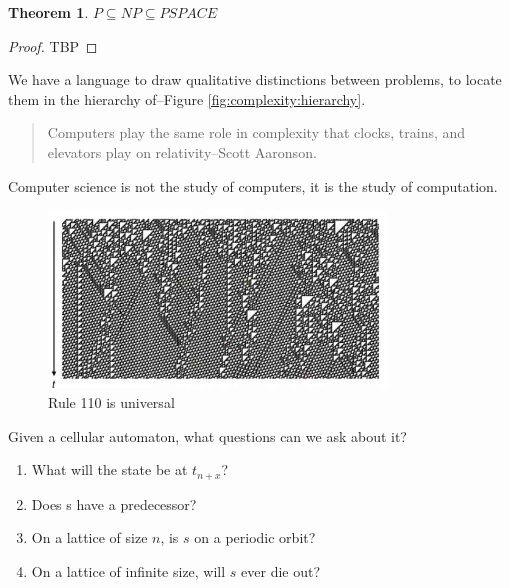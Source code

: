 \documentclass[]{article}
\newtheorem{thm}{Theorem}
\begin{document}
\begin{thm}
	$P \subseteq NP \subseteq PSPACE$
\end{thm}

\begin{proof}
	TBP
\end{proof}

We have a language to draw qualitative distinctions between problems, to locate them in the hierarchy of--Figure \ref{fig:complexity:hierarchy}.
\begin{quotation}
	Computers play the same role in complexity that clocks, trains, and elevators play on relativity--Scott Aaronson.
\end{quotation}

Computer science is not the study of computers, it is the study of computation.

\begin{figure}[H]
	\begin{center}
		\caption[Rule 110 is universal]{Rule 110 is universal\cite{cook2004universality}}
		\includegraphics[width=0.8\textwidth]{rule110}
	\end{center}
\end{figure}

Given a cellular automaton, what questions can we ask about it?

\begin{enumerate}
	\item What will the state be at $t_{n+x}$?

	\item Does s have a predecessor?

	\item On a lattice of size $n$, is $s$ on a periodic orbit?

	\item On a lattice of infinite size, will $s$ ever die out?
	
\end{enumerate}
\end{document}
